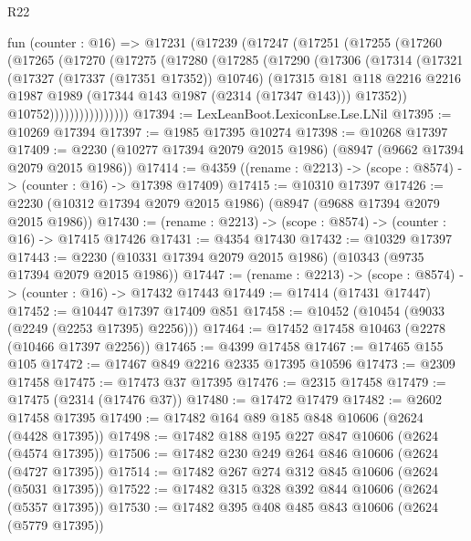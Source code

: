 \begin{lexlean}{R22}
\begin{coremodule}
        fun (counter : @16) =>
        @17231
          (@17239
            (@17247
              (@17251
                (@17255
                  (@17260
                    (@17265
                      (@17270
                        (@17275
                          (@17280
                            (@17285
                              (@17290
                                (@17306
                                  (@17314
                                    (@17321
                                      (@17327 (@17337 (@17351 @17352)) @10746)
                                      (@17315
                                        @181
                                        @118
                                        @2216
                                        @2216
                                        @1987
                                        @1989
                                        (@17344 @143 @1987 (@2314 (@17347 @143)))
                                        @17352))
                                    @10752))))))))))))))))
@17394 := LexLeanBoot.LexiconLse.Lse.LNil
@17395 := @10269 @17394
@17397 := @1985 @17395 @10274
@17398 := @10268 @17397
@17409 := @2230 (@10277 @17394 @2079 @2015 @1986) (@8947 (@9662 @17394 @2079 @2015 @1986))
@17414 := @4359 ((rename : @2213) -> (scope : @8574) -> (counter : @16) -> @17398 @17409)
@17415 := @10310 @17397
@17426 := @2230 (@10312 @17394 @2079 @2015 @1986) (@8947 (@9688 @17394 @2079 @2015 @1986))
@17430 := (rename : @2213) -> (scope : @8574) -> (counter : @16) -> @17415 @17426
@17431 := @4354 @17430
@17432 := @10329 @17397
@17443 := @2230 (@10331 @17394 @2079 @2015 @1986) (@10343 (@9735 @17394 @2079 @2015 @1986))
@17447 := (rename : @2213) -> (scope : @8574) -> (counter : @16) -> @17432 @17443
@17449 := @17414 (@17431 @17447)
@17452 := @10447 @17397 @17409 @851
@17458 := @10452 (@10454 (@9033 (@2249 (@2253 @17395) @2256)))
@17464 := @17452 @17458 @10463 (@2278 (@10466 @17397 @2256))
@17465 := @4399 @17458
@17467 := @17465 @155 @105
@17472 := @17467 @849 @2216 @2335 @17395 @10596
@17473 := @2309 @17458
@17475 := @17473 @37 @17395
@17476 := @2315 @17458
@17479 := @17475 (@2314 (@17476 @37))
@17480 := @17472 @17479
@17482 := @2602 @17458 @17395
@17490 := @17482 @164 @89 @185 @848 @10606 (@2624 (@4428 @17395))
@17498 := @17482 @188 @195 @227 @847 @10606 (@2624 (@4574 @17395))
@17506 := @17482 @230 @249 @264 @846 @10606 (@2624 (@4727 @17395))
@17514 := @17482 @267 @274 @312 @845 @10606 (@2624 (@5031 @17395))
@17522 := @17482 @315 @328 @392 @844 @10606 (@2624 (@5357 @17395))
@17530 := @17482 @395 @408 @485 @843 @10606 (@2624 (@5779 @17395))

\end{coremodule}
\end{lexlean}
